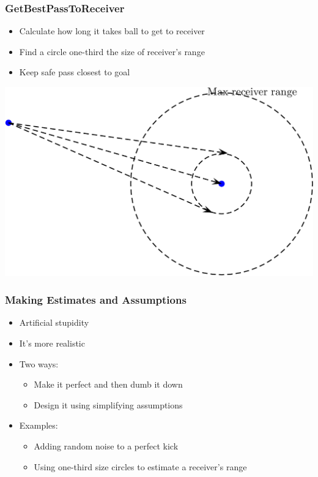 \documentclass[handout,t,compress]{beamer}
\newcommand{\bframe}[1]{\begin{frame}[fragile]\frametitle{#1}}
\begin{document}
\bframe{GetBestPassToReceiver}
\begin{itemize}
\item Calculate how long it takes ball to get to receiver
\item Find a circle one-third the size of receiver's range
\item Keep safe pass closest to goal
\end{itemize}
\includegraphics[scale=0.25]{bestpass.png}
\end{frame}

\bframe{Making Estimates and Assumptions}
\begin{itemize}
\item Artificial stupidity
\item It's more realistic
\item Two ways:
\begin{itemize}
\item Make it perfect and then dumb it down
\item Design it using simplifying assumptions
\end{itemize}
\item Examples:
\begin{itemize}
\item Adding random noise to a perfect kick
\item Using one-third size circles to estimate a receiver's range
\end{itemize}
\end{itemize}
\end{frame}
\end{document}
